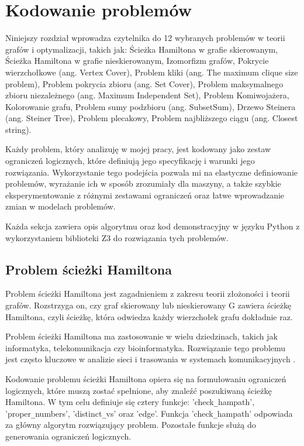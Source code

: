 \chapter{Kodowanie problemów}

Niniejszy rozdział wprowadza czytelnika do 12 wybranych problemów w teorii grafów i optymalizacji, takich jak:
Ścieżka Hamiltona w grafie skierowanym,
Ścieżka Hamiltona w grafie nieskierowanym, 
Izomorfizm grafów, 
Pokrycie wierzchołkowe (ang. Vertex Cover), 
Problem kliki (ang. The maximum clique size problem), 
Problem pokrycia zbioru (ang. Set Cover), 
Problem maksymalnego zbioru niezależnego (ang. Maximum Independent Set), 
Problem Komiwojażera, 
Kolorowanie grafu, 
Problem sumy podzbioru (ang. SubsetSum), 
Drzewo Steinera (ang. Steiner Tree), 
Problem plecakowy, 
Problem najbliższego ciągu (ang. Closest string).

Każdy problem, który analizuję w mojej pracy, jest kodowany jako zestaw ograniczeń logicznych, które definiują jego specyfikację i warunki jego rozwiązania. Wykorzystanie tego podejścia pozwala mi na elastyczne definiowanie problemów, wyrażanie ich w sposób zrozumiały dla maszyny, a także szybkie eksperymentowanie z różnymi zestawami ograniczeń oraz łatwe wprowadzanie zmian w modelach problemów.

Każda sekcja zawiera opis algorytmu oraz kod demonstracyjny w języku Python z wykorzystaniem biblioteki Z3 do rozwiązania tych problemów.

\section{Problem ścieżki Hamiltona}

Problem ścieżki Hamiltona jest zagadnieniem z zakresu teorii złożoności i teorii grafów. Rozstrzyga on, czy graf skierowany lub nieskierowany G zawiera ścieżkę Hamiltona, czyli ścieżkę, która odwiedza każdy wierzchołek grafu dokładnie raz.

Problem ścieżki Hamiltona ma zastosowanie w wielu dziedzinach, takich jak informatyka, telekomunikacja czy bioinformatyka. Rozwiązanie tego problemu jest często kluczowe w analizie sieci i trasowania w systemach komunikacyjnych \cite{enwiki:1190136070}.

Kodowanie problemu ścieżki Hamiltona opiera się na formułowaniu ograniczeń logicznych, które muszą zostać spełnione, aby znaleźć poszukiwaną ścieżkę Hamiltona. W tym celu definiuje się cztery funkcje: 'check\verb|_|hampath', 'proper\verb|_|numbers', 'distinct\verb|_|vs' oraz 'edge'. Funkcja 'check\verb|_|hampath' odpowiada za główny algorytm rozwiązujący problem. Pozostałe funkcje służą do generowania ograniczeń logicznych.


